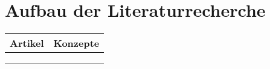 \section{Aufbau der Literaturrecherche}

\begin{table}[htbp]
    \begin{tabular}{|l|llll|}
    \hline
    \multicolumn{1}{|c|}{Artikel} & \multicolumn{4}{c|}{Konzepte}                                            \\ \hline
                                  & \multicolumn{1}{l|}{} & \multicolumn{1}{l|}{} & \multicolumn{1}{l|}{} &  \\ \hline
                                  & \multicolumn{1}{l|}{} & \multicolumn{1}{l|}{} & \multicolumn{1}{l|}{} &  \\ \hline
                                  & \multicolumn{1}{l|}{} & \multicolumn{1}{l|}{} & \multicolumn{1}{l|}{} &  \\ \hline
    \end{tabular}
    \end{table}